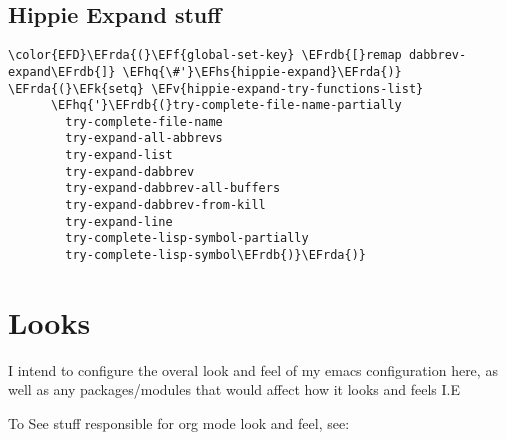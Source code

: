 \documentclass{article}
\newcommand{\EFk}[1]{\textcolor{EFk}{#1}} %
\newcommand{\EFf}[1]{\textcolor{EFf}{#1}} %
\newcommand{\EFv}[1]{\textcolor{EFv}{#1}} %
\newcommand{\EFhq}[1]{#1} %
\newcommand{\EFhs}[1]{\textcolor{EFhs}{#1}} %
\newcommand{\EFrda}[1]{\textcolor{EFrda}{#1}} %
\newcommand{\EFrdb}[1]{\textcolor{EFrdb}{#1}} %
\begin{document}
\subsection{Hippie Expand stuff}
\label{sec:org2d25c13}
\begin{Code}
\begin{Verbatim}
\color{EFD}\EFrda{(}\EFf{global-set-key} \EFrdb{[}remap dabbrev-expand\EFrdb{]} \EFhq{\#'}\EFhs{hippie-expand}\EFrda{)}
\EFrda{(}\EFk{setq} \EFv{hippie-expand-try-functions-list}
      \EFhq{'}\EFrdb{(}try-complete-file-name-partially
        try-complete-file-name
        try-expand-all-abbrevs
        try-expand-list
        try-expand-dabbrev
        try-expand-dabbrev-all-buffers
        try-expand-dabbrev-from-kill
        try-expand-line
        try-complete-lisp-symbol-partially
        try-complete-lisp-symbol\EFrdb{)}\EFrda{)}
\end{Verbatim}
\end{Code}

\section{Looks}
\label{sec:orge6365a7}
I intend to configure the overal look and feel of my emacs configuration here, as well as any packages/modules that would affect how it looks and feels
I.E

To See stuff responsible for org mode look and feel, see:
\end{document}
